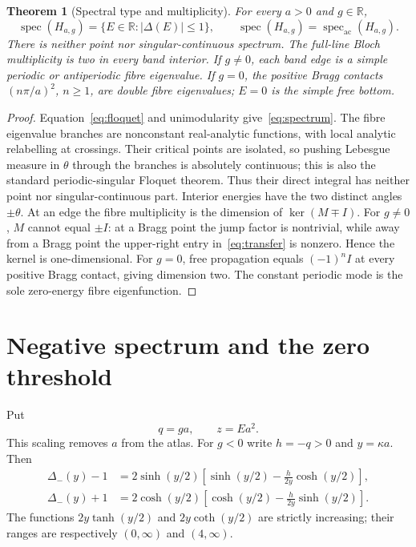 \documentclass[10pt]{article}
\newtheorem{theorem}{Theorem}
\newcommand{\spec}{\operatorname{spec}}
\newcommand{\ac}{\mathrm{ac}}
\newcommand{\R}{\mathbb R}
\begin{document}
\begin{theorem}[Spectral type and multiplicity]\label{thm:floquet}
For every $a>0$ and $g\in\R$,
\begin{equation}\label{eq:spectrum}
 \spec(H_{a,g})=\{E\in\R:|\Delta(E)|\leq1\},
 \qquad \spec(H_{a,g})=\spec_{\ac}(H_{a,g}).
\end{equation}
There is neither point nor singular-continuous spectrum.  The full-line
Bloch multiplicity is two in every band interior.  If $g\ne0$, each band
edge is a simple periodic or antiperiodic fibre eigenvalue.  If $g=0$, the
positive Bragg contacts $(n\pi/a)^2$, $n\geq1$, are double fibre eigenvalues;
$E=0$ is the simple free bottom.
\end{theorem}
\begin{proof}
Equation~\eqref{eq:floquet} and unimodularity give~\eqref{eq:spectrum}.
The fibre eigenvalue branches are nonconstant real-analytic functions, with
local analytic relabelling at crossings.  Their critical points are isolated,
so pushing Lebesgue measure in $\theta$ through the branches is absolutely
continuous; this is also the standard periodic-singular Floquet theorem.
Thus their direct integral has neither point nor singular-continuous part.
Interior energies have the two distinct angles $\pm\theta$.  At an edge the fibre multiplicity is the
dimension of $\ker(M\mp I)$.  For $g\ne0$, $M$ cannot equal $\pm I$: at a
Bragg point the jump factor is nontrivial, while away from a Bragg point the
upper-right entry in~\eqref{eq:transfer} is nonzero.  Hence the kernel is
one-dimensional.  For $g=0$, free propagation equals $(-1)^nI$ at every
positive Bragg contact, giving dimension two.  The constant periodic mode is
the sole zero-energy fibre eigenfunction.
\end{proof}

\section{Negative spectrum and the zero threshold}
Put
\begin{equation}\label{eq:scaled}
 q=ga,\qquad z=Ea^2.
\end{equation}
This scaling removes $a$ from the atlas.  For $g<0$ write $h=-q>0$ and
$y=\kappa a$.  Then
\begin{align}
 \Delta_- (y)-1
 &=2\sinh(y/2)[\sinh(y/2)-\frac{h}{2y}\cosh(y/2)],\label{eq:nplus}\\
 \Delta_- (y)+1
 &=2\cosh(y/2)[\cosh(y/2)-\frac{h}{2y}\sinh(y/2)].\label{eq:nminus}
\end{align}
The functions $2y\tanh(y/2)$ and $2y\coth(y/2)$ are strictly increasing;
their ranges are respectively $(0,\infty)$ and $(4,\infty)$.
\end{document}
